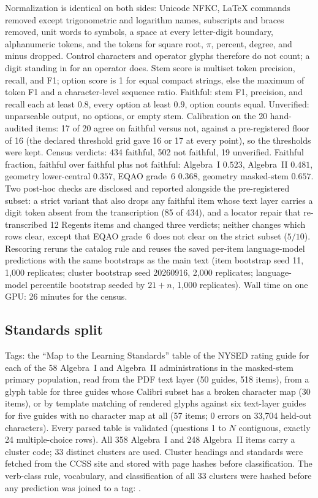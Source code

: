 Normalization is identical on both sides: Unicode NFKC, LaTeX commands removed except trigonometric and logarithm names, subscripts and braces removed, unit words to symbols, a space at every letter-digit boundary, alphanumeric tokens, and the tokens for square root, $\pi$, percent, degree, and minus dropped. Control characters and operator glyphs therefore do not count; a digit standing in for an operator does. Stem score is multiset token precision, recall, and F1; option score is 1 for equal compact strings, else the maximum of token F1 and a character-level sequence ratio. Faithful: stem F1, precision, and recall each at least $0.8$, every option at least $0.9$, option counts equal. Unverified: unparseable output, no options, or empty stem. Calibration on the 20 hand-audited items: 17 of 20 agree on faithful versus not, against a pre-registered floor of 16 (the declared threshold grid gave 16 or 17 at every point), so the thresholds were kept. Census verdicts: 434 faithful, 502 not faithful, 19 unverified. Faithful fraction, faithful over faithful plus not faithful: Algebra~I $0.523$, Algebra~II $0.481$, geometry lower-central $0.357$, EQAO grade~6 $0.368$, geometry masked-stem $0.657$. Two post-hoc checks are disclosed and reported alongside the pre-registered subset: a strict variant that also drops any faithful item whose text layer carries a digit token absent from the transcription (85 of 434), and a locator repair that re-transcribed 12 Regents items and changed three verdicts; neither changes which rows clear, except that EQAO grade~6 does not clear on the strict subset ($5/10$). Rescoring reruns the catalog rule and reuses the saved per-item language-model predictions with the same bootstraps as the main text (item bootstrap seed 11, 1{,}000 replicates; cluster bootstrap seed 20260916, 2{,}000 replicates; language-model percentile bootstrap seeded by $21+n$, 1{,}000 replicates). Wall time on one GPU: 26 minutes for the census.

\subsection{Standards split}
\label{app:standards}

Tags: the ``Map to the Learning Standards'' table of the NYSED rating guide for each of the 58 Algebra~I and Algebra~II administrations in the masked-stem primary population, read from the PDF text layer (50 guides, 518 items), from a glyph table for three guides whose Calibri subset has a broken character map (30 items), or by template matching of rendered glyphs against six text-layer guides for five guides with no character map at all (57 items; 0 errors on 33{,}704 held-out characters). Every parsed table is validated (questions 1 to $N$ contiguous, exactly 24 multiple-choice rows). All 358 Algebra~I and 248 Algebra~II items carry a cluster code; 33 distinct clusters are used. Cluster headings and standards were fetched from the CCSS site and stored with page hashes before classification. The verb-class rule, vocabulary, and classification of all 33 clusters were hashed before any prediction was joined to a tag:
.

